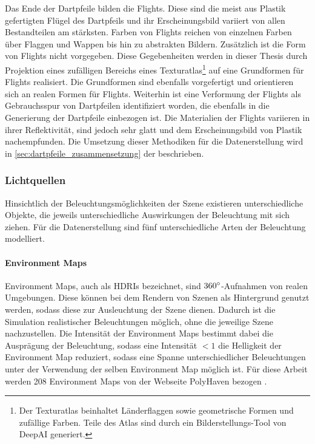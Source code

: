 Das Ende der Dartpfeile bilden die Flights. Diese sind die meist aus Plastik gefertigten Flügel des Dartpfeils und ihr Erscheinungsbild variiert von allen Bestandteilen am stärksten. Farben von Flights reichen von einzelnen Farben über Flaggen und Wappen bis hin zu abstrakten Bildern. Zusätzlich ist die Form von Flights nicht vorgegeben. Diese Gegebenheiten werden in dieser Thesis durch Projektion eines zufälligen Bereichs eines Texturatlas\footnote{Der Texturatlas beinhaltet Länderflaggen sowie geometrische Formen und zufällige Farben. Teile des Atlas sind durch ein Bilderstellungs-Tool von DeepAI \cite{deepai-image} generiert.} auf eine Grundformen für Flights realisiert. Die Grundformen sind ebenfalls vorgefertigt und orientieren sich an realen Formen für Flights. Weiterhin ist eine Verformung der Flights als Gebrauchsspur von Dartpfeilen identifiziert worden, die ebenfalls in die Generierung der Dartpfeile einbezogen ist. Die Materialien der Flights variieren in ihrer Reflektivität, sind jedoch sehr glatt und dem Erscheinungsbild von Plastik nachempfunden. Die Umsetzung dieser Methodiken für die Datenerstellung wird in \autoref{sec:dartpfeile_zusammensetzung} der  beschrieben.

\subsubsection{Lichtquellen}
\label{sec:lichter}

Hinsichtlich der Beleuchtungsmöglichkeiten der Szene existieren unterschiedliche Objekte, die jeweils unterschiedliche Auswirkungen der Beleuchtung mit sich ziehen. Für die Datenerstellung sind fünf unterschiedliche Arten der Beleuchtung modelliert.

\paragraph{Environment Maps}

Environment Maps, auch als HDRIs bezeichnet, sind $360^{\circ}$-Aufnahmen von realen Umgebungen. Diese können bei dem Rendern von Szenen als Hintergrund genutzt werden, sodass diese zur Ausleuchtung der Szene dienen. Dadurch ist die Simulation realistischer Beleuchtungen möglich, ohne die jeweilige Szene nachzustellen. Die Intensität der Environment Maps bestimmt dabei die Ausprägung der Beleuchtung, sodass eine Intensität $< 1$ die Helligkeit der Environment Map reduziert, sodass eine Spanne unterschiedlicher Beleuchtungen unter der Verwendung der selben Environment Map möglich ist. Für diese Arbeit werden 208 Environment Maps von der Webseite PolyHaven bezogen \cite{polyhaven}.

